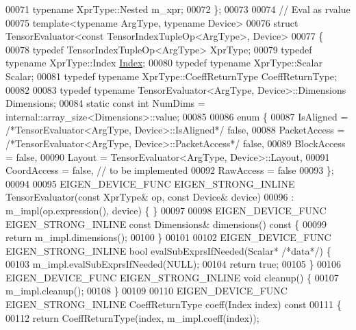 \begin{DoxyCode}
00071     \textcolor{keyword}{typename} XprType::Nested m\_xpr;
00072 \};
00073 
00074 \textcolor{comment}{// Eval as rvalue}
00075 \textcolor{keyword}{template}<\textcolor{keyword}{typename} ArgType, \textcolor{keyword}{typename} Device>
00076 \textcolor{keyword}{struct }TensorEvaluator<const TensorIndexTupleOp<ArgType>, Device>
00077 \{
00078   \textcolor{keyword}{typedef} TensorIndexTupleOp<ArgType> XprType;
00079   \textcolor{keyword}{typedef} \textcolor{keyword}{typename} XprType::Index \hyperlink{namespace_eigen_a62e77e0933482dafde8fe197d9a2cfde}{Index};
00080   \textcolor{keyword}{typedef} \textcolor{keyword}{typename} XprType::Scalar Scalar;
00081   \textcolor{keyword}{typedef} \textcolor{keyword}{typename} XprType::CoeffReturnType CoeffReturnType;
00082 
00083   \textcolor{keyword}{typedef} \textcolor{keyword}{typename} TensorEvaluator<ArgType, Device>::Dimensions Dimensions;
00084   \textcolor{keyword}{static} \textcolor{keyword}{const} \textcolor{keywordtype}{int} NumDims = internal::array\_size<Dimensions>::value;
00085 
00086   \textcolor{keyword}{enum} \{
00087     IsAligned = \textcolor{comment}{/*TensorEvaluator<ArgType, Device>::IsAligned*/} \textcolor{keyword}{false},
00088     PacketAccess = \textcolor{comment}{/*TensorEvaluator<ArgType, Device>::PacketAccess*/} \textcolor{keyword}{false},
00089     BlockAccess = \textcolor{keyword}{false},
00090     Layout = TensorEvaluator<ArgType, Device>::Layout,
00091     CoordAccess = \textcolor{keyword}{false},  \textcolor{comment}{// to be implemented}
00092     RawAccess = \textcolor{keyword}{false}
00093   \};
00094 
00095   EIGEN\_DEVICE\_FUNC EIGEN\_STRONG\_INLINE TensorEvaluator(\textcolor{keyword}{const} XprType& op, \textcolor{keyword}{const} Device& device)
00096       : m\_impl(op.expression(), device) \{ \}
00097 
00098   EIGEN\_DEVICE\_FUNC EIGEN\_STRONG\_INLINE \textcolor{keyword}{const} Dimensions& dimensions()\textcolor{keyword}{ const }\{
00099     \textcolor{keywordflow}{return} m\_impl.dimensions();
00100   \}
00101 
00102   EIGEN\_DEVICE\_FUNC EIGEN\_STRONG\_INLINE \textcolor{keywordtype}{bool} evalSubExprsIfNeeded(Scalar* \textcolor{comment}{/*data*/}) \{
00103     m\_impl.evalSubExprsIfNeeded(NULL);
00104     \textcolor{keywordflow}{return} \textcolor{keyword}{true};
00105   \}
00106   EIGEN\_DEVICE\_FUNC EIGEN\_STRONG\_INLINE \textcolor{keywordtype}{void} cleanup() \{
00107     m\_impl.cleanup();
00108   \}
00109 
00110   EIGEN\_DEVICE\_FUNC EIGEN\_STRONG\_INLINE CoeffReturnType coeff(Index index)\textcolor{keyword}{ const}
00111 \textcolor{keyword}{  }\{
00112     \textcolor{keywordflow}{return} CoeffReturnType(index, m\_impl.coeff(index));

\end{DoxyCode}
